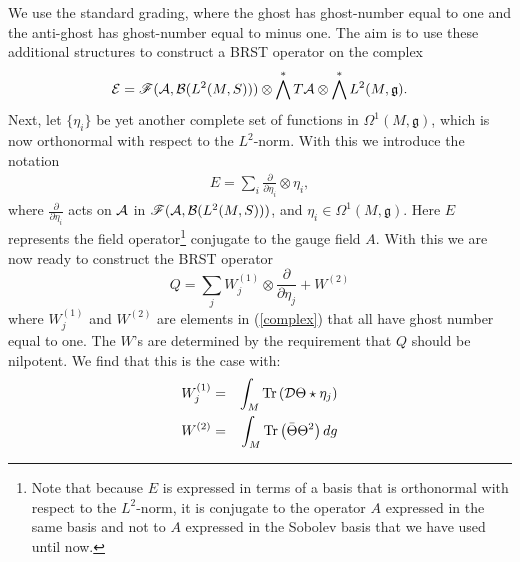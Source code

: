 \documentclass[letterpaper,12pt]{article}
\newcommand{\nn}{\nonumber}
\def\d{\delta}
\def\OO{\Omega}
\def\ca{{\cal A}}
\def\cb{{\cal B}}
\def\cd{{\cal D}}
\def\ce{{\cal E}}
\def\cf{{\cal F}}
\newcommand{\pa}{\partial}
\begin{document}
We use the standard grading, where the ghost has ghost-number equal to one and the anti-ghost has ghost-number equal to minus one.
The aim is to use these additional structures to construct a BRST operator on the complex 
\begin{equation}
\ce=\mathscr{F} (\ca , \cb (L^2(M,S )) ) \otimes \bigwedge^* T\ca  \otimes \bigwedge^* L^2(M,\mathfrak{g}).
\label{complex}
\end{equation} 
%
Next, let $\{{\eta}_i\}$ be yet another complete set of functions in $\OO^1(M,\mathfrak{g})$, which is now orthonormal with respect to the $L^2$-norm. With this we introduce the notation
\begin{eqnarray}
E = \sum_i \frac{\pa}{\pa\eta_i} \otimes   \eta_i  ,
\nn
\end{eqnarray}
where $\frac{\pa}{\pa\eta_i}$ acts on $\ca$ in $\mathscr{F} (\ca , \cb (L^2(M,S )) )$, and $\eta_i\in \OO^1(M,\mathfrak{g}) 
$.
Here 
$E$ represents the field operator\footnote{Note that because $E$ is expressed in terms of a basis that is orthonormal with respect to the $L^2$-norm, it is conjugate to the operator $A$ expressed in the same basis and not to $A$ expressed in the Sobolev basis that we have used until now.}  conjugate to the gauge field $A$.
%
%
With this we are now ready to construct the BRST operator
$$
Q = \sum_j W^{(1)}_{j} \otimes \frac{\pa}{\pa {\eta}_j} + W^{(2)} %
$$
where $W^{(1)}_{j}$ and $W^{(2)}$ %
are elements in (\ref{complex}) that all have ghost number equal to one. The $W$'s are determined by the requirement that $Q$ should be nilpotent. We find that this is the case with: 
\begin{eqnarray}
W^{(1)}_{j} &=& \int_M \mbox{Tr} \left(\cd \Theta \star {\eta}_j\right)
\nn\\
W^{(2)} &=& \int_M \mbox{Tr} \left( \bar{\Theta} \Theta^2 \right) dg
\nn
\end{eqnarray}
\end{document}
